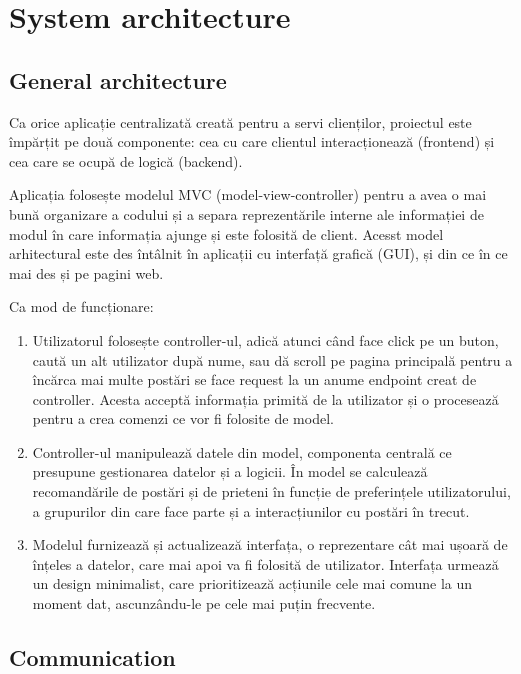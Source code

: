 \chapter{System architecture}
    \section{General architecture}
    Ca orice aplicație centralizată creată pentru a servi clienților, proiectul este împărțit pe două componente: cea cu care clientul interacționează (frontend) și cea care se ocupă de logică (backend).

    Aplicația folosește modelul MVC (model-view-controller) pentru a avea o mai bună organizare a codului și a separa reprezentările interne ale informației de modul în care informația ajunge și este folosită de client. Acesst model arhitectural este des întâlnit în aplicații cu interfață grafică (GUI), și din ce în ce mai des și pe pagini web. 
    
    Ca mod de funcționare:
    \begin{enumerate}[noitemsep, label=\textbullet, leftmargin=0.3cm]
        \item Utilizatorul folosește controller-ul, adică atunci când face click pe un buton, caută un alt utilizator după nume, sau dă scroll pe pagina principală pentru a încărca mai multe postări se face request la un anume endpoint creat de controller. Acesta acceptă informația primită de la utilizator și o procesează pentru a crea comenzi ce vor fi folosite de model.
        \item Controller-ul manipulează datele din model, componenta centrală ce presupune gestionarea datelor și a logicii. În model se calculează recomandările de postări și de prieteni în funcție de preferințele utilizatorului, a grupurilor din care face parte și a interacțiunilor cu postări în trecut.
        \item Modelul furnizează și actualizează interfața, o reprezentare cât mai ușoară de înțeles a datelor, care mai apoi va fi folosită de utilizator. Interfața urmează un design minimalist, care prioritizează acțiunile cele mai comune la un moment dat, ascunzându-le pe cele mai puțin frecvente. 
    \end{enumerate}
    
    \section{Communication}
